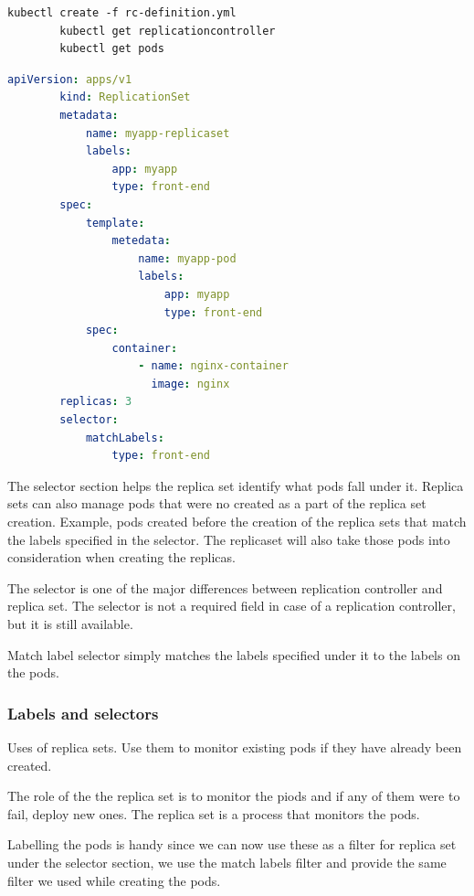 \documentclass[11pt]{book}
\begin{document}
    \begin{lstlisting}[language=terminal,caption={Pod commands}]
        kubectl create -f rc-definition.yml
        kubectl get replicationcontroller
        kubectl get pods
    \end{lstlisting}

    \begin{lstlisting}[language=yaml, caption={Replication Set}]
        apiVersion: apps/v1
        kind: ReplicationSet
        metadata:
            name: myapp-replicaset
            labels:
                app: myapp
                type: front-end
        spec:
            template:
                metedata:
                    name: myapp-pod
                    labels:
                        app: myapp
                        type: front-end
            spec:
                container:
                    - name: nginx-container
                      image: nginx
        replicas: 3
        selector:
            matchLabels:
                type: front-end
    \end{lstlisting}

    The selector section helps the replica set identify what pods fall under it.
    Replica sets can also manage pods that were no created as a part of the replica set creation.
    Example, pods created before the creation of the replica sets that match the labels specified in the selector.
    The replicaset will also take those pods into consideration when creating the replicas.

    The selector is one of the major differences between replication controller and replica set.
    The selector is not a required field in case of a replication controller, but it is still available.

    Match label selector simply matches the labels specified under it to the labels on the pods.

    \subsubsection{Labels and selectors}
    Uses of replica sets. Use them to monitor existing pods if they have already been created.

    The role of the the replica set is to monitor the piods and if any of them were to fail, deploy new ones.
    The replica set is a process that monitors the pods.

    Labelling the pods is handy since we can now use these as a filter for replica set under the selector section, we use the match labels filter and provide the same filter we used while creating the pods.
\end{document}
